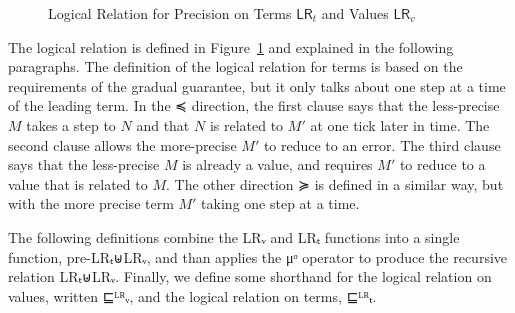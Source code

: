 \begin{figure}[tbp]
\caption{Logical Relation for Precision on Terms $\mathsf{LR}_t$
  and Values $\mathsf{LR}_v$}
\label{fig:log-rel-precision}
\end{figure}

The logical relation is defined in Figure~\ref{fig:log-rel-precision}
and explained in the following paragraphs.  The definition of the
logical relation for terms is based on the requirements of the gradual
guarantee, but it only talks about one step at a time of the leading
term. In the ≼ direction, the first clause says that the less-precise
$M$ takes a step to $N$ and that $N$ is related to $M′$ at one tick
later in time. The second clause allows the more-precise $M′$ to
reduce to an error. The third clause says that the less-precise $M$ is
already a value, and requires $M′$ to reduce to a value that is
related to $M$. The other direction ≽ is defined in a similar way,
but with the more precise term $M′$ taking one step at a time.

The following definitions combine the LRᵥ and LRₜ functions into a
single function, pre-LRₜ⊎LRᵥ, and than applies the μᵒ operator to
produce the recursive relation LRₜ⊎LRᵥ. Finally, we define some
shorthand for the logical relation on values, written ⊑ᴸᴿᵥ, and the
logical relation on terms, ⊑ᴸᴿₜ.

